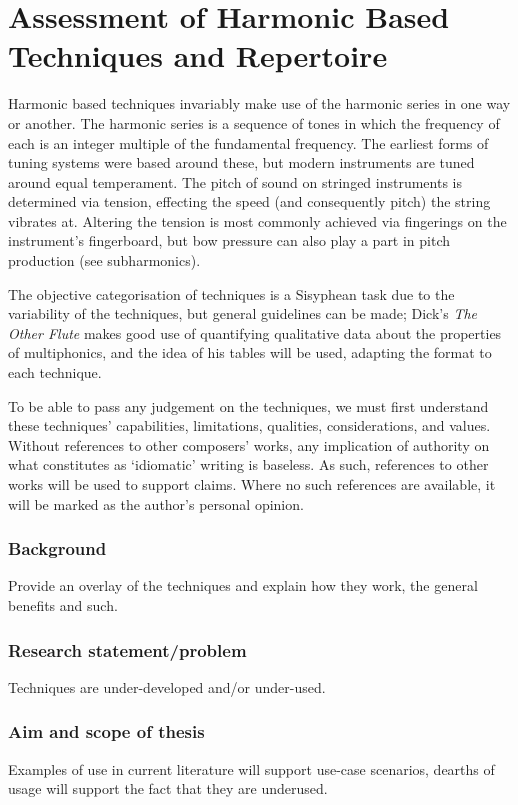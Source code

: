 
\chapter{Assessment of Harmonic Based Techniques and Repertoire}

Harmonic based techniques invariably make use of the harmonic series in one way or another. The harmonic series is a sequence of tones in which the frequency of each is an integer multiple of the fundamental frequency. The earliest forms of tuning systems were based around these, but modern instruments are tuned around equal temperament. The pitch of sound on stringed instruments is determined via tension, effecting the speed (and consequently pitch) the string vibrates at. Altering the tension is most commonly achieved via fingerings on the instrument's fingerboard, but bow pressure can also play a part in pitch production (see subharmonics).

The objective categorisation of techniques is a Sisyphean task due to the variability of the techniques, but general guidelines can be made; Dick's \emph{The Other Flute} makes good use of quantifying qualitative data about the properties of multiphonics, and the idea of his tables will be used, adapting the format to each technique. 

To be able to pass any judgement on the techniques, we must first understand these techniques' capabilities, limitations, qualities, considerations, and values. Without references to other composers' works, any implication of authority on what constitutes as `idiomatic' writing is baseless. As such, references to other works will be used to support claims. Where no such references are available, it will be marked as the author's personal opinion.

\subsection{Background}
Provide an overlay of the techniques and explain how they work, the general benefits and such.
\subsection{Research statement/problem}
Techniques are under-developed and/or under-used.

\subsection{Aim and scope of thesis}
Examples of use in current literature will support use-case scenarios, dearths of usage will support the fact that they are underused.

